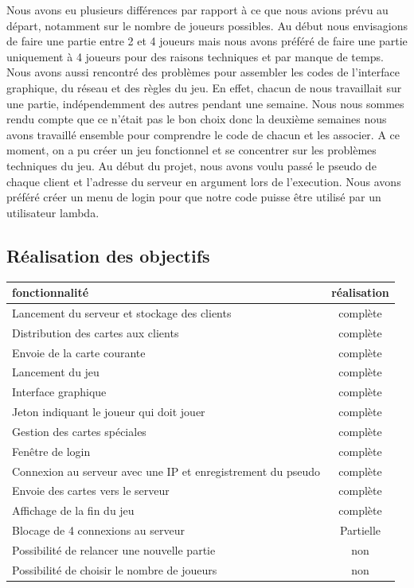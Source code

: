 \documentclass[french]{article}
\begin{document}
Nous avons eu plusieurs différences par rapport à ce que nous avions prévu au départ, notamment sur le nombre de joueurs possibles. Au début nous envisagions de faire une partie entre 2 et 4 joueurs mais nous avons préféré de faire une partie uniquement à 4 joueurs pour des raisons techniques et par manque de temps. Nous avons aussi rencontré des problèmes pour assembler les codes de l'interface graphique, du réseau et des règles du jeu. En effet, chacun de nous travaillait sur une partie, indépendemment des autres pendant une semaine. Nous nous sommes rendu compte que ce n'était pas le bon choix donc la deuxième semaines nous avons travaillé ensemble pour comprendre le code de chacun et les associer. A ce moment, on a pu créer un jeu fonctionnel et se concentrer sur les problèmes techniques du jeu.
Au début du projet, nous avons voulu passé le pseudo de chaque client et l'adresse du serveur en argument lors de l'execution. Nous avons préféré créer un menu de login pour que notre code puisse être utilisé par un utilisateur lambda.

\subsection{Réalisation des objectifs}
\begin{tabular}{| l | c |}
	\hline
	fonctionnalité & réalisation \\
	\hline
	\hline
	Lancement du serveur et stockage des clients & complète \\
	\hline
	Distribution des cartes aux clients & complète \\
	\hline
	Envoie de la carte courante & complète \\
	\hline
	Lancement du jeu & complète \\
	\hline
	Interface graphique & complète \\
	\hline
	Jeton indiquant le joueur qui doit jouer & complète \\
	\hline
	Gestion des cartes spéciales & complète \\
	\hline
	Fenêtre de login & complète \\
	\hline
	Connexion au serveur avec une IP et enregistrement du pseudo & complète \\
	\hline
	Envoie des cartes vers le serveur & complète \\
	\hline
	Affichage de la fin du jeu & complète \\
	\hline
	Blocage de 4 connexions au serveur & Partielle \\
	\hline
	Possibilité de relancer une nouvelle partie & non \\
	\hline
	Possibilité de choisir le nombre de joueurs & non \\
	\hline
	
\end{tabular}
\end{document}
